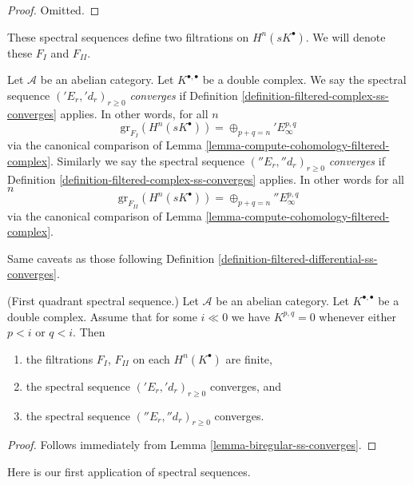 \begin{proof}
Omitted.
\end{proof}

\noindent
These spectral sequences define two filtrations on $H^n(sK^\bullet)$.
We will denote these $F_I$ and $F_{II}$.

\begin{definition}
\label{definition-ss-double-complex-converge}
Let $\mathcal{A}$ be an abelian category.
Let $K^{\bullet, \bullet}$ be a double complex.
We say the spectral sequence $({}'E_r, {}'d_r)_{r \geq 0}$
{\it converges} if Definition \ref{definition-filtered-complex-ss-converges}
applies. In other words, for all $n$
$$
\text{gr}_{F_I}(H^n(sK^\bullet)) = \oplus_{p + q = n} {}'E_\infty^{p, q}
$$
via the canonical comparison of
Lemma \ref{lemma-compute-cohomology-filtered-complex}.
Similarly we say the spectral sequence $({}''E_r, {}''d_r)_{r \geq 0}$
{\it converges} if Definition \ref{definition-filtered-complex-ss-converges}
applies. In other words for all $n$
$$
\text{gr}_{F_{II}}(H^n(sK^\bullet)) = \oplus_{p + q = n} {}''E_\infty^{p, q}
$$
via the canonical comparison of
Lemma \ref{lemma-compute-cohomology-filtered-complex}.
\end{definition}

\noindent
Same caveats as those following
Definition \ref{definition-filtered-differential-ss-converges}.

\begin{lemma}
\label{lemma-first-quadrant-ss}
(First quadrant spectral sequence.)
Let $\mathcal{A}$ be an abelian category.
Let $K^{\bullet, \bullet}$ be a double complex.
Assume that for some $i \ll 0$ we have
$K^{p, q} = 0$ whenever either $p < i$ or $q < i$.
Then
\begin{enumerate}
\item the filtrations $F_I$, $F_{II}$ on each $H^n(K^\bullet)$ are finite,
\item the spectral sequence $({}'E_r, {}'d_r)_{r \geq 0}$ converges, and
\item the spectral sequence $({}''E_r, {}''d_r)_{r \geq 0}$ converges.
\end{enumerate}
\end{lemma}

\begin{proof}
Follows immediately from Lemma \ref{lemma-biregular-ss-converges}.
\end{proof}

\noindent
Here is our first application of spectral sequences.

